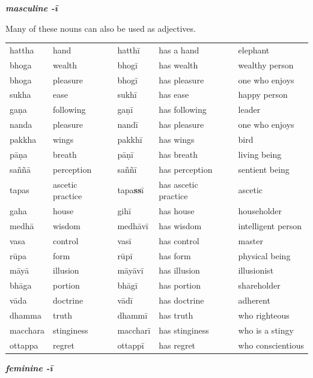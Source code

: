 \documentclass[11pt,oneside]{memoir}
\begin{document}
\clearpage

{\centering\textit{\textbf{masculine -ī}}\par}

Many of these nouns can also be used as adjectives.

\begin{center}
\begin{tabular}{lllll}
hattha & hand & hatthī & has a hand & elephant\\[0pt]
bhoga & wealth & bhogī & has wealth & wealthy person\\[0pt]
bhoga & pleasure & bhogī & has pleasure & one who enjoys\\[0pt]
sukha & ease & sukhī & has ease & happy person\\[0pt]
gaṇa & following & gaṇī & has following & leader\\[0pt]
nanda & pleasure & nandī & has pleasure & one who enjoys\\[0pt]
pakkha & wings & pakkhī & has wings & bird\\[0pt]
pāṇa & breath & pāṇī & has breath & living being\\[0pt]
saññā & perception & saññī & has perception & sentient being\\[0pt]
tapas & ascetic practice & tapa\textbf{ss}ī & has ascetic practice & ascetic\\[0pt]
gaha & house & gihī & has house & householder\\[0pt]
medhā & wisdom & medhāvī & has wisdom & intelligent person\\[0pt]
vasa & control & vasī & has control & master\\[0pt]
rūpa & form & rūpī & has form & physical being\\[0pt]
māyā & illusion & māyāvī & has illusion & illusionist\\[0pt]
bhāga & portion & bhāgī & has portion & shareholder\\[0pt]
vāda & doctrine & vādī & has doctrine & adherent\\[0pt]
dhamma & truth & dhammī & has truth & who righteous\\[0pt]
macchara & stinginess & maccharī & has stinginess & who is a stingy\\[0pt]
ottappa & regret & ottappī & has regret & who conscientious\\[0pt]
\end{tabular}
\end{center}

{\centering\textit{\textbf{feminine -ī}}\par}
\end{document}
